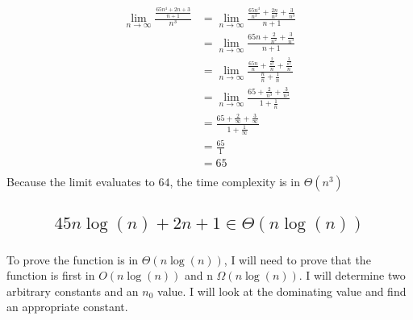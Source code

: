\documentclass{article}
\begin{document}
        \subsubsection{}
            \begin{align*}
                \lim_{n\to\infty} \frac{\frac{65n^4 + 2n + 3}{n + 1}}{n^3}
                &= \lim_{n\to\infty} \frac{\frac{65n^4}{n^3} + \frac{2n}{n^3} + \frac{3}{n^3}}{n + 1}\\
                &= \lim_{n\to\infty} \frac{65n + \frac{2}{n^2} + \frac{3}{n^3}}{n + 1}\\
                &= \lim_{n\to\infty} \frac{\frac{65n}{n} + \frac{\frac{2}{n^2}}{n} + \frac{\frac{3}{n^3}}{n}}{\frac{n}{n} + \frac{1}{n}}\\
                &= \lim_{n\to\infty} \frac{65 + \frac{2}{n^3} + \frac{3}{n^4}}{1 + \frac{1}{n}}\\
                &=\frac{65 + \frac{2}{\infty} + \frac{3}{\infty}}{1 + \frac{1}{\infty}}\\
                &=\frac{65}{1}\\
                &=65 \\
            \end{align*}
            Because the limit evaluates to $64$, the time complexity is in $\Theta(n^3)$
            
    \subsection{$$45n\log(n) + 2n + 1 \in \Theta(n\log(n))$$}
        \subsubsection{}
            To prove the function is in $\Theta(n\log(n))$, I will need to prove that the function is first in $O(n\log(n))$ and n $\Omega(n\log(n))$. I will determine two arbitrary constants and an $n_0$ value. I will look at the dominating value and find an appropriate constant.
            
\end{document}
